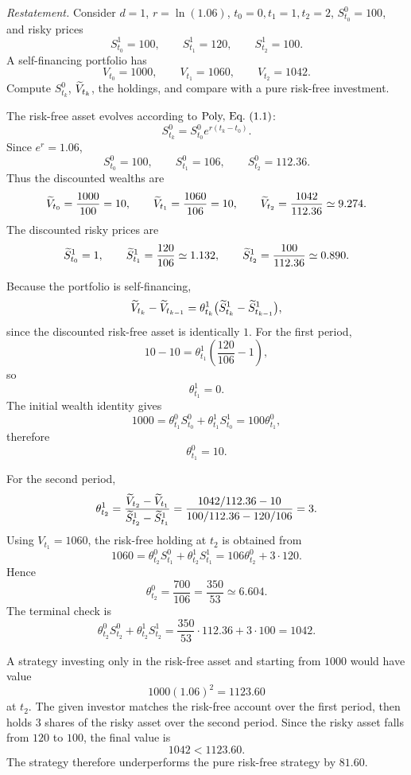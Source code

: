 \begin{exercise}
\emph{Restatement.}  Consider \(d=1\), \(r=\ln(1.06)\),
\(t_0=0,t_1=1,t_2=2\), \(S^0_{t_0}=100\), and risky prices
\[
  S^1_{t_0}=100,\qquad S^1_{t_1}=120,\qquad S^1_{t_2}=100.
\]
A self-financing portfolio has
\[
  V_{t_0}=1000,\qquad V_{t_1}=1060,\qquad V_{t_2}=1042.
\]
Compute \(S^0_{t_k}\), \(\widetilde V_{t_k}\), the holdings, and compare with a
pure risk-free investment.
\end{exercise}

\begin{solution}
The risk-free asset evolves according to \(\textup{Poly, Eq.~(1.1)}\):
\[
  S^0_{t_k}=S^0_{t_0}e^{r(t_k-t_0)}.
\]
Since \(e^r=1.06\),
\[
  S^0_{t_0}=100,\qquad
  S^0_{t_1}=106,\qquad
  S^0_{t_2}=112.36.
\]
Thus the discounted wealths are
\[
  \widetilde V_{t_0}=\frac{1000}{100}=10,\qquad
  \widetilde V_{t_1}=\frac{1060}{106}=10,\qquad
  \widetilde V_{t_2}=\frac{1042}{112.36}\simeq 9.274.
\]
The discounted risky prices are
\[
  \widetilde S^1_{t_0}=1,\qquad
  \widetilde S^1_{t_1}=\frac{120}{106}\simeq 1.132,
  \qquad
  \widetilde S^1_{t_2}=\frac{100}{112.36}\simeq 0.890.
\]

Because the portfolio is self-financing,
\[
  \widetilde V_{t_k}-\widetilde V_{t_{k-1}}
    =
  \theta^1_{t_k}
  \bigl(\widetilde S^1_{t_k}-\widetilde S^1_{t_{k-1}}\bigr),
\]
since the discounted risk-free asset is identically \(1\).  For the first
period,
\[
  10-10
    =
  \theta^1_{t_1}
  \left(\frac{120}{106}-1\right),
\]
so
\[
  \theta^1_{t_1}=0.
\]
The initial wealth identity gives
\[
  1000=\theta^0_{t_1}S^0_{t_0}+\theta^1_{t_1}S^1_{t_0}
       =100\theta^0_{t_1},
\]
therefore
\[
  \theta^0_{t_1}=10.
\]

For the second period,
\[
  \theta^1_{t_2}
  =
  \frac{\widetilde V_{t_2}-\widetilde V_{t_1}}
       {\widetilde S^1_{t_2}-\widetilde S^1_{t_1}}
  =
  \frac{1042/112.36-10}{100/112.36-120/106}
  =3.
\]
Using \(V_{t_1}=1060\), the risk-free holding at \(t_2\) is obtained from
\[
  1060=\theta^0_{t_2}S^0_{t_1}+\theta^1_{t_2}S^1_{t_1}
      =106\theta^0_{t_2}+3\cdot 120.
\]
Hence
\[
  \theta^0_{t_2}=\frac{700}{106}=\frac{350}{53}\simeq 6.604.
\]
The terminal check is
\[
  \theta^0_{t_2}S^0_{t_2}+\theta^1_{t_2}S^1_{t_2}
    =
  \frac{350}{53}\cdot 112.36+3\cdot 100
    =1042.
\]

A strategy investing only in the risk-free asset and starting from \(1000\)
would have value
\[
  1000(1.06)^2=1123.60
\]
at \(t_2\).  The given investor matches the risk-free account over the first
period, then holds \(3\) shares of the risky asset over the second period.
Since the risky asset falls from \(120\) to \(100\), the final value is
\[
  1042<1123.60.
\]
The strategy therefore underperforms the pure risk-free strategy by
\(81.60\).
\end{solution}
